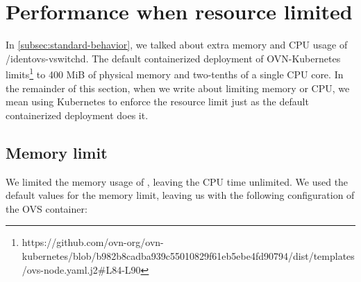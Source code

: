 

\section{Performance when resource limited}

In \cref{subsec:standard-behavior}, we talked about extra memory and CPU usage of /ident{ovs-vswitchd}. The default containerized deployment of OVN-Kubernetes limits\footnote{https://github.com/ovn-org/ovn-kubernetes/blob/b982b8cadba939c55010829f61eb5ebe4fd90794/dist/templates/ovs-node.yaml.j2\#L84-L90}  to 400 MiB of physical memory and two-tenths of a single CPU core. In the remainder of this section, when we write about limiting memory or CPU, we mean using Kubernetes to enforce the resource limit just as the default containerized deployment does it.

\subsection{Memory limit}
\label{subsec:memory}
We limited the memory usage of , leaving the CPU time unlimited. We used the default values for the memory limit, leaving us with the following configuration of the OVS container:

